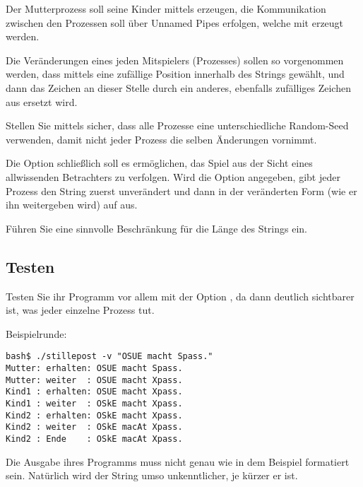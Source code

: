 Der Mutterprozess soll seine Kinder mittels  erzeugen,
die Kommunikation zwischen den Prozessen soll über Unnamed Pipes
erfolgen, welche mit  erzeugt werden.

Die Veränderungen eines jeden Mitspielers (Prozesses) sollen so
vorgenommen werden, dass mittels  eine zufällige
Position innerhalb des Strings gewählt, und dann das Zeichen an
dieser Stelle durch ein anderes, ebenfalls zufälliges Zeichen aus
\osueregex{[a-zA-Z]} ersetzt wird.

Stellen Sie mittels  sicher, dass alle Prozesse eine
unterschiedliche Random-Seed verwenden, damit nicht jeder Prozess die
selben Änderungen vornimmt.

Die Option  schließlich soll es ermöglichen, das Spiel aus
der Sicht eines allwissenden Betrachters zu verfolgen. Wird die Option
angegeben, gibt jeder Prozess den String zuerst unverändert und dann
in der veränderten Form (wie er ihn weitergeben wird) auf
 aus.

Führen Sie eine sinnvolle Beschränkung für die Länge des Strings
ein.

\subsection*{Testen}

Testen Sie ihr Programm vor allem mit der Option , da dann
deutlich sichtbarer ist, was jeder einzelne Prozess tut.

Beispielrunde:
\begin{verbatim}
bash$ ./stillepost -v "OSUE macht Spass."
Mutter: erhalten: OSUE macht Spass.
Mutter: weiter  : OSUE macht Xpass.
Kind1 : erhalten: OSUE macht Xpass.
Kind1 : weiter  : OSkE macht Xpass.
Kind2 : erhalten: OSkE macht Xpass.
Kind2 : weiter  : OSkE macAt Xpass.
Kind2 : Ende    : OSkE macAt Xpass.
\end{verbatim}

Die Ausgabe ihres Programms muss nicht genau wie in dem Beispiel
formatiert sein. Natürlich wird der String umso unkenntlicher, je
kürzer er ist.

\osueguidelinestwo



